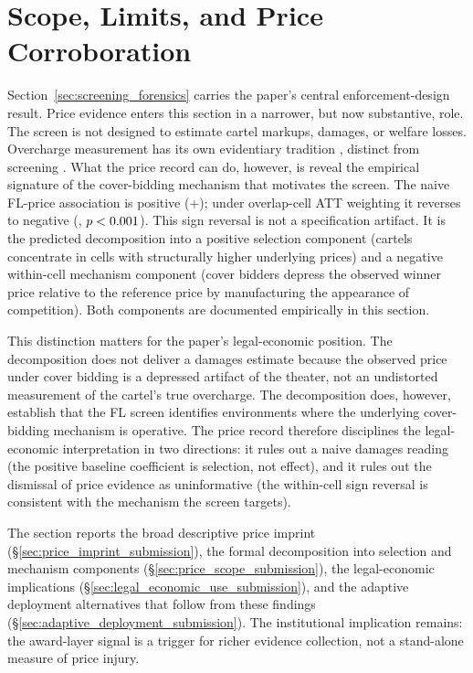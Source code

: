 \section{Scope, Limits, and Price Corroboration}
\label{sec:price_scope_conclusion}

Section~\ref{sec:screening_forensics} carries the paper's
central enforcement-design result. Price evidence enters this
section in a narrower, but now substantive, role. The screen is
not designed to estimate cartel markups, damages, or welfare
losses. Overcharge measurement has its own evidentiary tradition
\citep{bryant1991price,connor2007price}, distinct from screening
\citep{marshall2012economics,harrington2008detecting}. What the
price record can do, however, is reveal the empirical signature
of the cover-bidding mechanism that motivates the screen. The
naive FL-price association is positive (+\valBetaBroad); under
overlap-cell ATT weighting it reverses to negative
(\valScopeOverlapCoef, $p<0.001$).
This sign reversal is not a specification artifact. It is the
predicted decomposition into a positive selection component
(cartels concentrate in cells with structurally higher
underlying prices) and a negative within-cell mechanism component
(cover bidders depress the observed winner price relative to the
reference price by manufacturing the appearance of competition).
Both components are documented empirically in this section.

This distinction matters for the paper's legal-economic
position. The decomposition does not deliver a damages estimate
because the observed price under cover bidding is a depressed
artifact of the theater, not an undistorted measurement of the
cartel's true overcharge. The decomposition does, however,
establish that the FL screen identifies environments where the
underlying cover-bidding mechanism is operative. The price
record therefore disciplines the legal-economic interpretation
in two directions: it rules out a naive damages reading (the
positive baseline coefficient is selection, not effect), and it
rules out the dismissal of price evidence as uninformative (the
within-cell sign reversal is consistent with the mechanism the
screen targets).

The section reports the broad descriptive price imprint
(\S\ref{sec:price_imprint_submission}), the formal decomposition
into selection and mechanism components
(\S\ref{sec:price_scope_submission}), the legal-economic
implications (\S\ref{sec:legal_economic_use_submission}), and
the adaptive deployment alternatives that follow from these
findings (\S\ref{sec:adaptive_deployment_submission}). The
institutional implication remains: the award-layer signal is a
trigger for richer evidence collection, not a stand-alone measure
of price injury.

